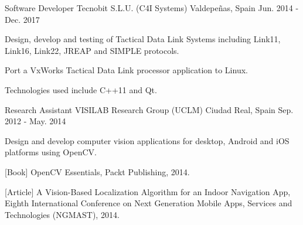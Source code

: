 \begin{cventries}
  \cventry
    {Software Developer} %
    {Tecnobit S.L.U. (C4I Systems)} %
    {Valdepeñas, Spain} %
    {Jun. 2014 - Dec. 2017} %
    {
      \begin{cvitems} %
        \item {Design, develop and testing of Tactical Data Link Systems including Link11, Link16, Link22, JREAP and SIMPLE protocols.}
        \item {Port a VxWorks Tactical Data Link processor application to Linux.}
        \item {Technologies used include C++11 and Qt.}
      \end{cvitems}
    }


  \cventry
    {Research Assistant} %
    {VISILAB Research Group (UCLM)} %
    {Ciudad Real, Spain} %
    {Sep. 2012 - May. 2014} %
    {
      \begin{cvitems} %
        \item {Design and develop computer vision applications for desktop, Android and iOS platforms using OpenCV.}
        \item {[Book] OpenCV Essentials, Packt Publishing, 2014.}
        \item {[Article] A Vision-Based Localization Algorithm for an Indoor Navigation App, Eighth International Conference on Next Generation Mobile Apps, Services and Technologies (NGMAST), 2014.}
      \end{cvitems}
    }




\end{cventries}
